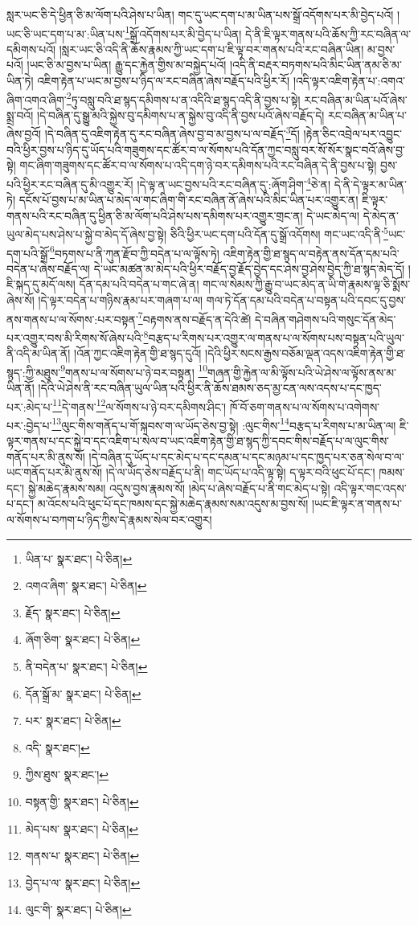 སླར་ཡང་ཅི་དེ་ཕྱིན་ཅི་མ་ལོག་པའི་ཤེས་པ་ཡིན། གང་དུ་ཡང་དག་པ་མ་ཡིན་པས་སྒྲོ་འདོགས་པར་མི་བྱེད་པའོ། །ཡང་ཅི་ཡང་དག་པ་མ་:ཡིན་པས་\footnote{ཡིན་པ་  སྣར་ཐང་།  པེ་ཅིན། }སྒྲོ་འདོགས་པར་མི་བྱེད་པ་ཡིན། དེ་ནི་ཇི་ལྟར་གནས་པའི་ཆོས་ཀྱི་རང་བཞིན་ལ་དམིགས་པའོ། །སླར་ཡང་ཅི་འདི་ནི་ཆོས་རྣམས་ཀྱི་ཡང་དག་པ་ཇི་ལྟ་བར་གནས་པའི་རང་བཞིན་ཡིན། མ་བྱས་པའོ། །ཡང་ཅི་མ་བྱས་པ་ཡིན། རྒྱུ་དང་རྐྱེན་གྱིས་མ་བསྐྱེད་པའོ། །འདི་ནི་བརྡར་བཏགས་པའི་མིང་ཡིན་ནམ་ཅི་མ་ཡིན་ཏེ། འཇིག་རྟེན་པ་ཡང་མ་བྱས་པ་ཉིད་ལ་རང་བཞིན་ཞེས་བརྗོད་པའི་ཕྱིར་རོ། །འདི་ལྟར་འཇིག་རྟེན་པ་:འགའ་ཞིག་འགའ་ཞིག་\footnote{འགའ་ཞིག་  སྣར་ཐང་།  པེ་ཅིན། }ཏུ་བསླུ་བའི་ཐ་སྙད་དམིགས་པ་ན་འདིའི་ཐ་སྙད་འདི་ནི་བྱས་པ་སྟེ། རང་བཞིན་མ་ཡིན་པའོ་ཞེས་སྨྲ་བའོ། །དེ་བཞིན་དུ་སྒྱུ་མའི་སྐྱེས་བུ་དམིགས་པ་ན་སྐྱེས་བུ་འདི་ནི་བྱས་པའོ་ཞེས་བརྗོད་དེ། རང་བཞིན་མ་ཡིན་པ་ཞེས་བྱའོ། །དེ་བཞིན་དུ་འཇིག་རྟེན་དུ་རང་བཞིན་ཞེས་བྱ་བ་མ་བྱས་པ་ལ་བརྗོད་\footnote{རྗོད་  སྣར་ཐང་།  པེ་ཅིན། }དོ། །རྟེན་ཅིང་འབྲེལ་པར་འབྱུང་བའི་ཕྱིར་བྱས་པ་ཉིད་དུ་ཡོད་པའི་གཟུགས་དང་ཚོར་བ་ལ་སོགས་པའི་དོན་ཀྱང་བསླུ་བར་སོ་སོར་སྣང་བའོ་ཞེས་བྱ་སྟེ། གང་ཞིག་གཟུགས་དང་ཚོར་བ་ལ་སོགས་པ་འདི་དག་ཉེ་བར་དམིགས་པའི་རང་བཞིན་དེ་ནི་བྱས་པ་སྟེ། བྱས་པའི་ཕྱིར་རང་བཞིན་དུ་མི་འགྱུར་རོ། །དེ་ལྟ་ན་ཡང་བྱས་པའི་རང་བཞིན་དུ་:ཞོག་ཤིག་\footnote{ཞོག་ཅིག་  སྣར་ཐང་།  པེ་ཅིན། }ཅེ་ན། དེ་ནི་དེ་ལྟར་མ་ཡིན་ཏེ། དངོས་པོ་བྱས་པ་མ་ཡིན་པ་མེད་ལ་གང་ཞིག་གི་རང་བཞིན་ནོ་ཞེས་པའི་མིང་ཡིན་པར་འགྱུར་ན། ཇི་ལྟར་གནས་པའི་རང་བཞིན་དུ་ཕྱིན་ཅི་མ་ལོག་པའི་ཤེས་པས་དམིགས་པར་འགྱུར་གྲང་ན། དེ་ཡང་མེད་ལ། དེ་མེད་ན་ཡུལ་མེད་པས་ཤེས་པ་སྐྱེ་བ་མེད་དོ་ཞེས་བྱ་སྟེ། ཅིའི་ཕྱིར་ཡང་དག་པའི་དོན་དུ་སྒྲོ་འདོགས། གང་ཡང་འདི་ནི་\footnote{ནི་བདེན་པ་  སྣར་ཐང་།  པེ་ཅིན། }ཡང་དག་པའི་སྒྲོ་\footnote{དོན་སྒྲོ་མ་  སྣར་ཐང་།  པེ་ཅིན། }བཏགས་པ་ནི་ཀུན་རྫོབ་ཀྱི་བདེན་པ་ལ་ལྟོས་ཏེ། འཇིག་རྟེན་གྱི་ཐ་སྙད་ལ་བརྟེན་ནས་དོན་དམ་པའི་བདེན་པ་ཞེས་བརྗོད་ལ། དེ་ཡང་མཚན་མ་མེད་པའི་ཕྱིར་བརྗོད་བྱ་རྗོད་བྱེད་དང་ཤེས་བྱ་ཤེས་བྱེད་ཀྱི་ཐ་སྙད་མེད་དོ། །ཇི་སྐད་དུ་མདོ་ལས། དོན་དམ་པའི་བདེན་པ་གང་ཞེ་ན། གང་ལ་སེམས་ཀྱི་རྒྱུ་བ་ཡང་མེད་ན་ཡི་གེ་རྣམས་ལྟ་ཅི་སྨོས་ཞེས་སོ། །དེ་ལྟར་བདེན་པ་གཉིས་རྣམ་པར་གཞག་པ་ལ། གལ་ཏེ་དོན་དམ་པའི་བདེན་པ་བསྟན་པའི་དབང་དུ་བྱས་ནས་གནས་པ་ལ་སོགས་:པར་བསྟན་\footnote{པར་  སྣར་ཐང་།  པེ་ཅིན། }བརྟགས་ནས་བརྗོད་ན་དེའི་ཚེ། དེ་བཞིན་གཤེགས་པའི་གསུང་དོན་མེད་པར་འགྱུར་བས་མི་རིགས་སོ་ཞེས་པའི་\footnote{འདི་  སྣར་ཐང་། }བརྩད་པ་རིགས་པར་འགྱུར་ལ་གནས་པ་ལ་སོགས་པས་བསྟན་པའི་ཡུལ་ནི་འདི་མ་ཡིན་ནོ། །འོན་ཀྱང་འཇིག་རྟེན་གྱི་ཐ་སྙད་དུའོ། །དེའི་ཕྱིར་སངས་རྒྱས་བཅོམ་ལྡན་འདས་འཇིག་རྟེན་གྱི་ཐ་སྙད་:ཀྱི་མཐུས་\footnote{ཀྱིས་ཐུས་  སྣར་ཐང་། }གནས་པ་ལ་སོགས་པ་ཉེ་བར་བསྟན། \footnote{བསྟན་གྱི་  སྣར་ཐང་།  པེ་ཅིན། }གཞན་གྱི་རྐྱེན་ལ་མི་ལྟོས་པའི་ཡེ་ཤེས་ལ་ལྟོས་ནས་མ་ཡིན་ནོ། །དེའི་ཡེ་ཤེས་ནི་རང་བཞིན་ཡུལ་ཡིན་པའི་ཕྱིར་ནི་ཆོས་ཐམས་ཅད་མྱ་ངན་ལས་འདས་པ་དང་ཁྱད་པར་:མེད་པ་\footnote{མེད་པས་  སྣར་ཐང་།  པེ་ཅིན། }དེ་གནས་\footnote{གནས་པ་  སྣར་ཐང་།  པེ་ཅིན། }ལ་སོགས་པ་ཉེ་བར་དམིགས་ཤིང་། ཁོ་བོ་ཅག་གནས་པ་ལ་སོགས་པ་འགེགས་པར་:བྱེད་པ་\footnote{བྱེད་པ་ལ་  སྣར་ཐང་།  པེ་ཅིན། }ལུང་གིས་གནོད་པ་གོ་སྐབས་ག་ལ་ཡོད་ཅེས་བྱ་སྟེ། :ལུང་གིས་\footnote{ལུང་གི་  སྣར་ཐང་།  པེ་ཅིན། }བརྩད་པ་རིགས་པ་མ་ཡིན་ལ། ཇི་ལྟར་གནས་པ་དང་སྐྱེ་བ་དང་འཇིག་པ་སེལ་བ་ཡང་འཇིག་རྟེན་གྱི་ཐ་སྙད་ཀྱི་དབང་གིས་བརྗོད་པ་ལ་ལུང་གིས་གནོད་པར་མི་ནུས་སོ། །དེ་བཞིན་དུ་ཡོད་པ་དང་མེད་པ་དང་དམན་པ་དང་མཉམ་པ་དང་ཁྱད་པར་ཅན་སེལ་བ་ལ་ཡང་གནོད་པར་མི་ནུས་སོ། །དེ་ལ་ཡོད་ཅེས་བརྗོད་པ་ནི། གང་ཡོད་པ་འདི་ལྟ་སྟེ། ད་ལྟར་བའི་ཕུང་པོ་དང་། ཁམས་དང་། སྐྱེ་མཆེད་རྣམས་སམ། འདུས་བྱས་རྣམས་སོ། །མེད་པ་ཞེས་བརྗོད་པ་ནི་གང་མེད་པ་སྟེ། འདི་ལྟར་གང་འདས་པ་དང་། མ་འོངས་པའི་ཕུང་པོ་དང་ཁམས་དང་སྐྱེ་མཆེད་རྣམས་སམ་འདུས་མ་བྱས་སོ། །ཡང་ཇི་ལྟར་ན་གནས་པ་ལ་སོགས་པ་བཀག་པ་ཉིད་ཀྱིས་དེ་རྣམས་སེལ་བར་འགྱུར། 